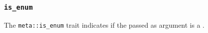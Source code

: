 
\subsubsection{\texttt{is\_enum}}

The \texttt{meta::is\_enum}
trait indicates if the  passed as argument is a .


